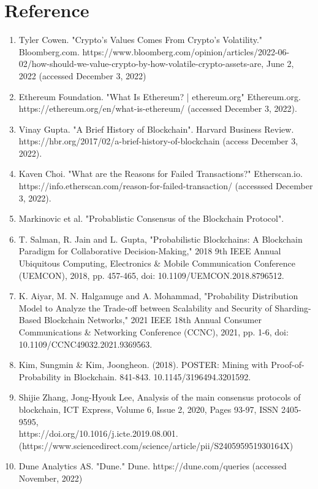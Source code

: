 \documentclass[12pt]{article}
\begin{document}
\section{Reference}
\begin{enumerate}
	\item Tyler Cowen. "Crypto's Values Comes From Crypto's Volatility." Bloomberg.com. https://www.bloomberg.com/opinion/articles/2022-06-02/how-should-we-value-crypto-by-how-volatile-crypto-assets-are, June 2, 2022 (accessed December 3, 2022)
	\item Ethereum Foundation. "What Is Ethereum? | ethereum.org" Ethereum.org. \\https://ethereum.org/en/what-is-ethereum/ (accessed December 3, 2022).
	\item Vinay Gupta. "A Brief History of Blockchain". Harvard Business Review. \\ https://hbr.org/2017/02/a-brief-history-of-blockchain (access December 3, 2022).
	\item Kaven Choi. "What are the Reasons for Failed Transactions?" Etherscan.io.\\ https://info.etherscan.com/reason-for-failed-transaction/ (accesssed December 3, 2022).
	\item Markinovic et al. "Probablistic Consensus of the Blockchain Protocol". \\ %
	\item T. Salman, R. Jain and L. Gupta, "Probabilistic Blockchains: A Blockchain Paradigm for Collaborative Decision-Making," 2018 9th IEEE Annual Ubiquitous Computing, Electronics \& Mobile Communication Conference (UEMCON), 2018, pp. 457-465, doi: 10.1109/UEMCON.2018.8796512.
	\item K. Aiyar, M. N. Halgamuge and A. Mohammad, "Probability Distribution Model to Analyze the Trade-off between Scalability and Security of Sharding-Based Blockchain Networks," 2021 IEEE 18th Annual Consumer Communications \& Networking Conference (CCNC), 2021, pp. 1-6, doi: 10.1109/CCNC49032.2021.9369563.
	\item Kim, Sungmin \& Kim, Joongheon. (2018). POSTER: Mining with Proof-of-Probability in Blockchain. 841-843. 10.1145/3196494.3201592. 
     \item Shijie Zhang, Jong-Hyouk Lee, Analysis of the main consensus protocols of blockchain, ICT Express, Volume 6, Issue 2, 2020, Pages 93-97, ISSN 2405-9595, \\https://doi.org/10.1016/j.icte.2019.08.001. \\(https://www.sciencedirect.com/science/article/pii/S240595951930164X)
	\item Dune Analytics AS. "Dune." Dune. https://dune.com/queries (accessed November, 2022)
\end{enumerate}
\end{document}
